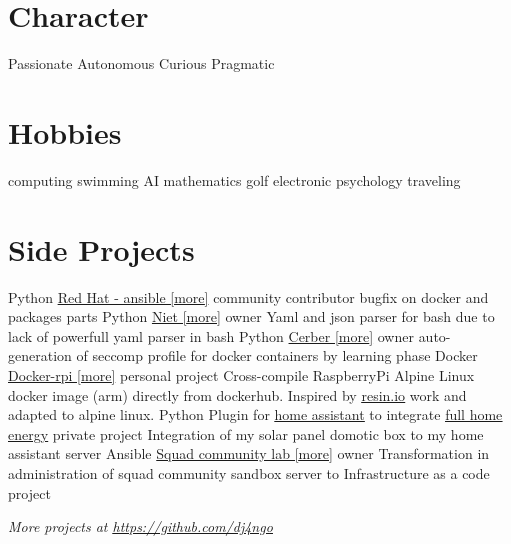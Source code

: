 \documentclass[]{friggeri-cv}
\begin{document}
\begin{aside}
    \section{Character}
        Passionate
        Autonomous
        Curious
        Pragmatic
        ~
    \section{Hobbies}
        computing
	swimming
	AI
	mathematics
	golf
        electronic
        psychology
        traveling
\end{aside}


\section{Side Projects}
\begin{entrylist}
    \entry
        {Python}
	{\href{https://github.com/ansible/ansible}{Red Hat - ansible [\underline{more}]}}
        {community contributor}
        {bugfix on docker and packages parts}
    \entry
        {Python}
        {\href{https://github.com/gr0und-s3ct0r/niet}{Niet [\underline{more}]}}
        {owner}
        {Yaml and json parser for bash due to lack of powerfull yaml parser in bash}
    \entry
        {Python}
        {\href{https://github.com/gr0und-s3ct0r/cerber}{Cerber [\underline{more}]}}
        {owner}
        {auto-generation of seccomp profile for docker containers by learning phase}
    \entry
        {Docker}
	{\href{https://github.com/dj4ngo/docker-rpi-alpine-scratch}{Docker-rpi [\underline{more}]}}
        {personal project}
	{Cross-compile RaspberryPi Alpine Linux docker image (arm) directly from dockerhub. Inspired by 
	\href{https://resin.io/blog/building-arm-containers-on-any-x86-machine-even-dockerhub/}{\underline{resin.io}}
	work and adapted to alpine linux.}
    \entry
        {Python}
	{Plugin for
	\href{https://www.home-assistant.io/}{\underline{home assistant}}
	to integrate
	\href{http://www.full-home-energy.com/}{\underline{full home energy}}}
        {private project}
	{Integration of my solar panel domotic box to my home assistant server}
    \entry
        {Ansible}
        {\href{https://gitlab.com/squad-lcv/labo}{Squad community lab [\underline{more}]}}
	{owner}
        {Transformation in administration of squad community sandbox server to Infrastructure as a code project}
\end{entrylist}


\begin{flushright}
	\emph{More projects at 
	\href{https://github.com/dj4ngo}{\underline{https://github.com/dj4ngo}}}
\end{flushright}
%
%
\end{document}
